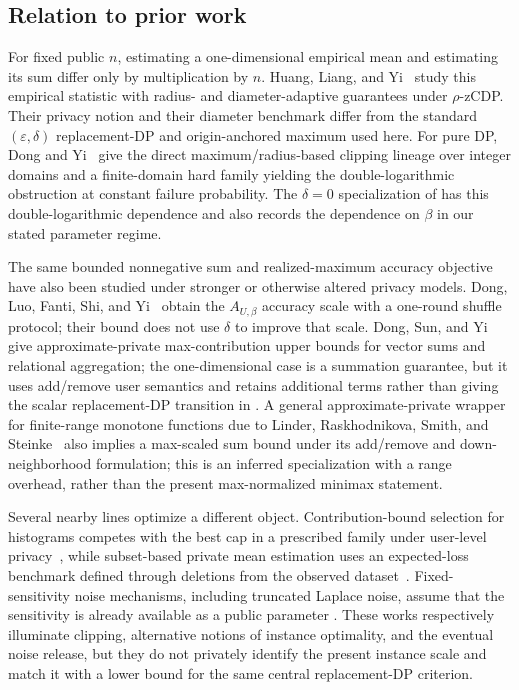 \documentclass[11pt]{article}
\begin{document}
\subsection{Relation to prior work}

For fixed public $n$, estimating a one-dimensional empirical mean and
estimating its sum differ only by multiplication by $n$.  Huang, Liang, and
Yi~\cite{HuangLiangYi2021Mean} study this empirical statistic with
radius- and diameter-adaptive guarantees under $\rho$-zCDP.  Their privacy
notion and their diameter benchmark differ from the standard
$(\varepsilon,\delta)$ replacement-DP and origin-anchored maximum used here.
For pure DP, Dong and Yi~\cite{DongYi2023Universal} give the direct
maximum/radius-based clipping lineage over integer domains and a finite-domain
hard family yielding the double-logarithmic obstruction at constant failure
probability.  The $\delta=0$ specialization of  has this
double-logarithmic dependence and also records the dependence on $\beta$ in
our stated parameter regime.

The same bounded nonnegative sum and realized-maximum accuracy objective have
also been studied under stronger or otherwise altered privacy models.  Dong,
Luo, Fanti, Shi, and Yi~\cite{DongLuoFantiShiYi2024Clipping} obtain the
$A_{U,\beta}$ accuracy scale with a one-round shuffle protocol; their bound
does not use $\delta$ to improve that scale.  Dong, Sun, and
Yi~\cite{DongSunYi2023BetterComposition} give approximate-private
max-contribution upper bounds for vector sums and relational aggregation;
the one-dimensional case is a summation guarantee, but it uses add/remove
user semantics and retains additional terms rather than giving the scalar
replacement-DP transition in .  A general
approximate-private wrapper for finite-range monotone functions due to
Linder, Raskhodnikova, Smith, and
Steinke~\cite{LinderRaskhodnikovaSmithSteinke2025BlackBox} also implies a
max-scaled sum bound under its add/remove and down-neighborhood formulation;
this is an inferred specialization with a range overhead, rather than the
present max-normalized minimax statement.

Several nearby lines optimize a different object.  Contribution-bound
selection for histograms competes with the best cap in a prescribed family
under user-level privacy~\cite{LiuSureshZhuKairouzGruteser2023Contribution},
while subset-based private mean estimation uses an expected-loss benchmark
defined through deletions from the observed
dataset~\cite{DickKuleszaSunSuresh2023Subset}.  Fixed-sensitivity noise
mechanisms, including truncated Laplace noise, assume that the sensitivity is
already available as a public parameter
\cite{GengDingGuoKumar2020Tradeoff}.  These works respectively illuminate
clipping, alternative notions of instance optimality, and the eventual noise
release, but they do not privately identify the present instance scale and
match it with a lower bound for the same central replacement-DP criterion.
\end{document}
